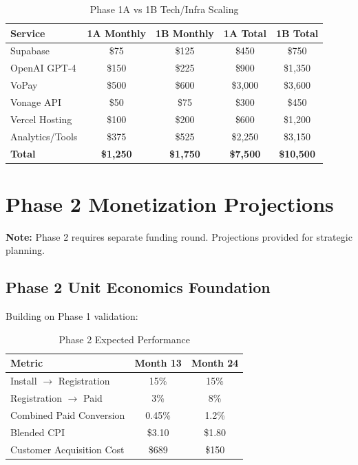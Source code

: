 \documentclass[11pt,letterpaper]{article}
\begin{document}
\begin{table}[h]
\centering
\caption{Phase 1A vs 1B Tech/Infra Scaling}
\begin{tabular}{|l|c|c|c|c|}
\hline
\textbf{Service} & \textbf{1A Monthly} & \textbf{1B Monthly} & \textbf{1A Total} & \textbf{1B Total} \\
\hline
Supabase & \$75 & \$125 & \$450 & \$750 \\
OpenAI GPT-4 & \$150 & \$225 & \$900 & \$1,350 \\
VoPay & \$500 & \$600 & \$3,000 & \$3,600 \\
Vonage API & \$50 & \$75 & \$300 & \$450 \\
Vercel Hosting & \$100 & \$200 & \$600 & \$1,200 \\
Analytics/Tools & \$375 & \$525 & \$2,250 & \$3,150 \\
\textbf{Total} & \textbf{\$1,250} & \textbf{\$1,750} & \textbf{\$7,500} & \textbf{\$10,500} \\
\hline
\end{tabular}
\end{table}

\newpage

\section{Phase 2 Monetization Projections}

\textbf{Note:} Phase 2 requires separate funding round. Projections provided for strategic planning.

\subsection{Phase 2 Unit Economics Foundation}

Building on Phase 1 validation:

\begin{table}[h]
\centering
\caption{Phase 2 Expected Performance}
\begin{tabular}{|l|c|c|}
\hline
\textbf{Metric} & \textbf{Month 13} & \textbf{Month 24} \\
\hline
Install $\rightarrow$ Registration & 15\% & 15\% \\
Registration $\rightarrow$ Paid & 3\% & 8\% \\
Combined Paid Conversion & 0.45\% & 1.2\% \\
Blended CPI & \$3.10 & \$1.80 \\
Customer Acquisition Cost & \$689 & \$150 \\
\hline
\end{tabular}
\end{table}
\end{document}
